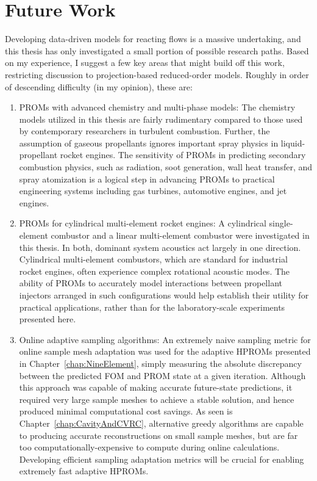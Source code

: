 \section{Future Work}

Developing data-driven models for reacting flows is a massive undertaking, and this thesis has only investigated a small portion of possible research paths. Based on my experience, I suggest a few key areas that might build off this work, restricting discussion to projection-based reduced-order models. Roughly in order of descending difficulty (in my opinion), these are:

\begin{enumerate}
    \item PROMs with advanced chemistry and multi-phase models: The chemistry models utilized in this thesis are fairly rudimentary compared to those used by contemporary researchers in turbulent combustion. Further, the assumption of gaseous propellants ignores important spray physics in liquid-propellant rocket engines. The sensitivity of PROMs in predicting secondary combustion physics, such as radiation, soot generation, wall heat transfer, and spray atomization is a logical step in advancing PROMs to practical engineering systems including gas turbines, automotive engines, and jet engines.
    \item PROMs for cylindrical multi-element rocket engines: A cylindrical single-element combustor and a linear multi-element combustor were investigated in this thesis. In both, dominant system acoustics act largely in one direction. Cylindrical multi-element combustors, which are standard for industrial rocket engines, often experience complex rotational acoustic modes. The ability of PROMs to accurately model interactions between propellant injectors arranged in such configurations would help establish their utility for practical applications, rather than for the laboratory-scale experiments presented here.
    \item Online adaptive sampling algorithms: An extremely naive sampling metric for online sample mesh adaptation was used for the adaptive HPROMs presented in Chapter~\ref{chap:NineElement}, simply measuring the absolute discrepancy between the predicted FOM and PROM state at a given iteration. Although this approach was capable of making accurate future-state predictions, it required very large sample meshes to achieve a stable solution, and hence produced minimal computational cost savings. As seen is Chapter~\ref{chap:CavityAndCVRC}, alternative greedy algorithms are capable to producing accurate reconstructions on small sample meshes, but are far too computationally-expensive to compute during online calculations. Developing efficient sampling adaptation metrics will be crucial for enabling extremely fast adaptive HPROMs.

\end{enumerate}
